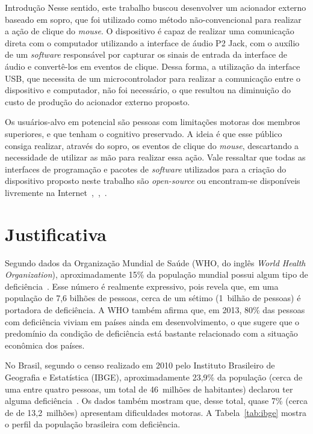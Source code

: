 \begin{chapter}{Introdução}
Nesse sentido, este trabalho buscou desenvolver um acionador externo baseado em
sopro, que foi utilizado como método não-convencional para realizar a ação de
clique do \textit{mouse}. O dispositivo é capaz de realizar uma comunicação
direta com o computador utilizando a interface de áudio P2 Jack, com o auxílio
de um \textit{software} responsável por capturar os sinais de entrada da
interface de áudio e convertê-los em eventos de clique. Dessa forma, a
utilização da interface USB, que necessita de um microcontrolador para realizar
a comunicação entre o dispositivo e computador, não foi necessário, o que
resultou na diminuição do custo de produção do acionador externo proposto. 

Os usuários-alvo em potencial são pessoas com limitações motoras dos membros
superiores, e que tenham o cognitivo preservado. A ideia é que esse público
consiga realizar, através do sopro, os eventos de clique do \textit{mouse},
descartando a necessidade de utilizar as mão para realizar essa ação. Vale
ressaltar que todas as interfaces de programação e pacotes de \textit{software}
utilizados para a criação do dispositivo proposto neste trabalho são
\textit{open-source} ou encontram-se disponíveis livremente na
Internet~\cite{portaudio},~\cite{xlib},~\cite{ErickGit}.

\section{Justificativa}

Segundo dados da Organização Mundial de Saúde (WHO, do inglês \textit{World
Health Organization}), aproximadamente 15\% da população mundial possui algum
tipo de deficiência~\cite{WHO15}. Esse número é realmente expressivo, pois
revela que, em uma população de 7,6 bilhões de pessoas, cerca de um sétimo
(1~bilhão de pessoas) é portadora de deficiência. A WHO também afirma que,
em 2013, 80\% das pessoas com deficiência viviam em países ainda em
desenvolvimento, o que sugere que o predomínio da condição de deficiência está
bastante relacionado com a situação econômica dos países.
  
No Brasil, segundo o censo realizado em 2010 pelo Instituto Brasileiro de
Geografia e Estatística (IBGE), aproximadamente 23,9\% da população (cerca de
uma entre quatro pessoas, um total de 46~milhões de habitantes) declarou ter
alguma deficiência~\cite{tIBGE}. Os dados também mostram que, desse total, quase
7\% (cerca de de 13,2~milhões) apresentam dificuldades motoras. A
Tabela~\ref{tab:ibge} mostra o perfil da população brasileira com deficiência.


\end{chapter}
